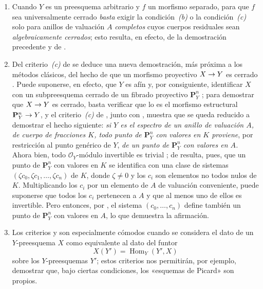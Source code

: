 \documentclass[oneside,10pt]{amsart}
\makeatletter
\newcommand{\ega@arrow}[2]{\mathchoice{#1}{#2}{#2}{#2}}
\renewcommand{\to}{\ega@arrow{\longrightarrow}{\rightarrow}}
\newcommand{\oldpage}[2][]{\marginnote{\normalfont\footnotesize\textbf{#1}~|~#2}\ignorespaces}
\let\EGAOriginalLabel\label
\renewcommand{\label}[1]{\phantomsection\EGAOriginalLabel{#1}}
\makeatother
\begin{document}

\begin{remarks}[7.3.9]
\label{II.7.3.9-fr}
\begin{enumerate}
  \item[\rm{(i)}] Cuando $Y$ es un preesquema arbitrario y $f$ un morfismo separado, para que $f$ sea universalmente cerrado \emph{basta} exigir la condición~\emph{(b)} o la condición~\emph{(c)} solo para anillos de valuación $A$ \emph{completos} cuyos cuerpos residuales sean \emph{algebraicamente cerrados};
  esto resulta, en efecto, de la demostración precedente y de .

  \item[\rm{(ii)}] Del criterio~\emph{(c)} de  se deduce una nueva demostración, más próxima a los métodos clásicos, del hecho de que un morfismo proyectivo $X\to Y$ es cerrado .
  Puede suponerse, en efecto, que $Y$ es afín y, por consiguiente, identificar $X$ con un subpreesquema cerrado de un fibrado proyectivo $\mathbf{P}_Y^n$ ;
  para demostrar que $X\to Y$ es cerrado, basta verificar que lo es el morfismo estructural $\mathbf{P}_Y^n\to Y$, y el criterio~\emph{(c)} de , junto con , muestra que se queda reducido a demostrar el hecho siguiente:
  \emph{si $Y$ es el espectro de un anillo de valuación $A$, de cuerpo de fracciones $K$, todo punto de $\mathbf{P}_Y^n$ con valores en $K$ proviene}, por restricción al punto genérico de $Y$, \emph{de un punto de $\mathbf{P}_Y^n$ con valores en $A$.}
  Ahora bien, todo $\mathcal{O}_Y$-módulo invertible es trivial ;
  de  resulta, pues, que un punto de $\mathbf{P}_Y^n$ con valores en $K$ se identifica con una clase de sistemas
  $(\zeta c_0,\zeta c_1,\ldots,\zeta
c_n)$
  de $K$, donde $\zeta\neq0$ y los $c_i$ son elementos no todos nulos de $K$.
  Multiplicando los $c_i$ por un elemento de $A$ de
\oldpage[II]{146}
  valuación conveniente, puede suponerse que todos los $c_i$ pertenecen a $A$ y que al menos uno de ellos es invertible.
  Pero entonces, por , el sistema $(c_0,\ldots,c_n)$ define también un punto de $\mathbf{P}_Y^n$ con valores en $A$, lo que demuestra la afirmación.

  \item[\rm{(iii)}] Los criterios  y  son especialmente cómodos cuando se considera el dato de un $Y$-preesquema $X$ como equivalente al dato del funtor
  \[
X(Y')=\operatorname{Hom}_Y(Y',X)
\]
  sobre los $Y$-preesquemas $Y'$;
  estos criterios nos permitirán, por ejemplo, demostrar que, bajo ciertas condiciones, los «esquemas de Picard» son propios.
\end{enumerate}
\end{remarks}
\end{document}
